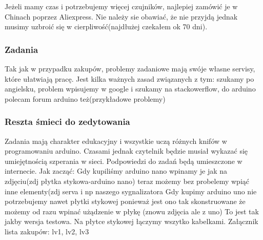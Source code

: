 Jeżeli mamy czas i potrzebujemy więcej czujników, najlepiej zamówić je w Chinach poprzez Aliexpress. Nie należy sie obawiać, że nie przyjdą jednak musimy uzbroić się w cierpliwość(najdłużej czekałem ok 70 dni).

\subsubsection{Zadania}
Tak jak w przypadku zakupów, problemy zadaniowe mają swóje własne servisy, które ułatwiają pracę. Jest kilka ważnych zasad związanych z tym: szukamy po angielsku, problem wpisujemy w google i szukamy na stackowerflow, do arduino polecam forum arduino też(przykładowe problemy)
\subsubsection{Reszta śmieci do zedytowania}
Zadania mają charakter edukacyjny i wszystkie uczą różnych knifów w programowaniu arduino. Czasami jednak czytelnik będzie musiał wykazać się umiejętnością szperania w sieci. Podpowiedzi do zadań będą umieszczone w internecie.
Jak zacząć:
Gdy kupiliśmy arduino nano wpinamy je jak na zdjęciu(zdj płytka stykowa-arduino nano) teraz możemy bez probelemy wpiąć inne elementy(zdj serva i np naszego sygnalizatora
Gdy kupimy arduino uno nie potrzebujemy nawet płytki stykowej ponieważ jest ono tak skonstruowane że możemy od razu wpinać użądzenie w płykę
(znowu zdjęcia ale z uno)
To jest tak jakby wersja testowa. Na płytce stykowej łączymy wszytko kabelkami.
Załącznik lista zakupów: lv1, lv2, lv3

